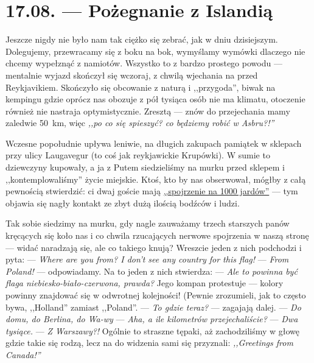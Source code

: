 \chapter*{17.08. --- Pożegnanie z Islandią}

Jeszcze nigdy nie było nam tak ciężko się zebrać, jak w dniu dzisiejszym. Dolegujemy, przewracamy się z boku na bok, wymyślamy wymów\-ki dlaczego nie chcemy wypełznąć z namiotów. Wszystko to z bardzo prostego powodu --- mentalnie wyjazd skończył się wczoraj, z chwilą wjechania na  przed Reykjavikiem. Skończyło się obcowanie z naturą i ,,przygoda'', biwak na kempingu gdzie oprócz nas obozuje z pół tysiąca osób nie ma klimatu, otoczenie również nie nastraja optymistycznie. Zresztą --- znów do przejechania mamy zaledwie 50~km, więc \emph{,,po co się spieszyć? co będziemy robić w Asbru?!''}

Wczesne popołudnie upływa leniwie, na długich zakupach pamiątek w sklepach przy ulicy Laugavegur (to coś jak reykjawickie Krupówki). W sumie to dziewczyny kupowały, a ja z Putem siedzieliśmy na murku przed sklepem i ,,kontemplowaliśmy'' życie miejskie. Ktoś, kto by nas obserwował, mógłby z całą pewnością stwierdzić: ci dwaj goście mają \href{http://en.wikipedia.org/wiki/Thousand-yard_stare}{,,spojrzenie na 1000 jardów''} --- tym objawia się nagły kontakt ze zbyt dużą ilością bodźców i ludzi.


Tak sobie siedzimy na murku, gdy nagle zauważamy trzech starszych panów kręcących się koło nas i co chwila rzucających nerwowe spojrzenia w naszą stronę --- widać naradzają się, ale co takiego knują? Wreszcie jeden z nich podchodzi i pyta: \newline
--- \emph{Where are you from? I don’t see any country for this flag!} \newline
--- \emph{From Poland!} --- odpowiadamy. \newline
Na to jeden z nich stwierdza: \newline
--- \emph{Ale to powinna być flaga niebiesko-biało-czerwona, prawda?} \newline
Jego kompan protestuje --- kolory powinny znajdować się w odwrotnej kolejności! (Pewnie zrozumieli, jak to często bywa, ,,Holland'' zamiast ,,Poland''. \newline
--- \emph{To gdzie teraz?} --- zagajają dalej. \newline
--- \emph{Do domu, do Berlina, do Wa-wy\textellipsis} \newline
--- \emph{Aha, a ile kilometrów przejechaliście?} \newline
--- \emph{Dwa tysiące.} \newline
--- \emph{Z Warszawy?!} \newline
Ogólnie to straszne tępaki, aż zachodziliśmy w głowę gdzie takie się rodzą, lecz na do widzenia sami się przyznali: \emph{,,Greetings from Canada!''}

